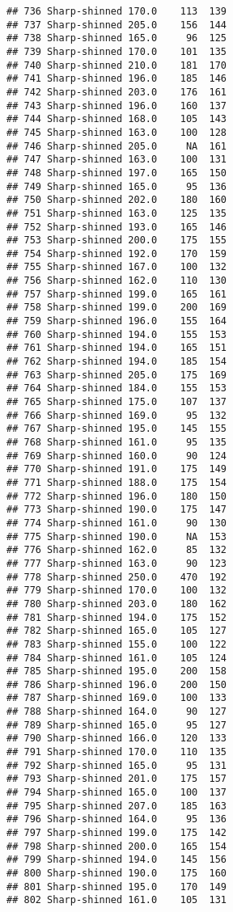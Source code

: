 \documentclass[
]{article}
\begin{document}
\begin{verbatim}
## 736 Sharp-shinned 170.0    113  139
## 737 Sharp-shinned 205.0    156  144
## 738 Sharp-shinned 165.0     96  125
## 739 Sharp-shinned 170.0    101  135
## 740 Sharp-shinned 210.0    181  170
## 741 Sharp-shinned 196.0    185  146
## 742 Sharp-shinned 203.0    176  161
## 743 Sharp-shinned 196.0    160  137
## 744 Sharp-shinned 168.0    105  143
## 745 Sharp-shinned 163.0    100  128
## 746 Sharp-shinned 205.0     NA  161
## 747 Sharp-shinned 163.0    100  131
## 748 Sharp-shinned 197.0    165  150
## 749 Sharp-shinned 165.0     95  136
## 750 Sharp-shinned 202.0    180  160
## 751 Sharp-shinned 163.0    125  135
## 752 Sharp-shinned 193.0    165  146
## 753 Sharp-shinned 200.0    175  155
## 754 Sharp-shinned 192.0    170  159
## 755 Sharp-shinned 167.0    100  132
## 756 Sharp-shinned 162.0    110  130
## 757 Sharp-shinned 199.0    165  161
## 758 Sharp-shinned 199.0    200  169
## 759 Sharp-shinned 196.0    155  164
## 760 Sharp-shinned 194.0    155  153
## 761 Sharp-shinned 194.0    165  151
## 762 Sharp-shinned 194.0    185  154
## 763 Sharp-shinned 205.0    175  169
## 764 Sharp-shinned 184.0    155  153
## 765 Sharp-shinned 175.0    107  137
## 766 Sharp-shinned 169.0     95  132
## 767 Sharp-shinned 195.0    145  155
## 768 Sharp-shinned 161.0     95  135
## 769 Sharp-shinned 160.0     90  124
## 770 Sharp-shinned 191.0    175  149
## 771 Sharp-shinned 188.0    175  154
## 772 Sharp-shinned 196.0    180  150
## 773 Sharp-shinned 190.0    175  147
## 774 Sharp-shinned 161.0     90  130
## 775 Sharp-shinned 190.0     NA  153
## 776 Sharp-shinned 162.0     85  132
## 777 Sharp-shinned 163.0     90  123
## 778 Sharp-shinned 250.0    470  192
## 779 Sharp-shinned 170.0    100  132
## 780 Sharp-shinned 203.0    180  162
## 781 Sharp-shinned 194.0    175  152
## 782 Sharp-shinned 165.0    105  127
## 783 Sharp-shinned 155.0    100  122
## 784 Sharp-shinned 161.0    105  124
## 785 Sharp-shinned 195.0    200  158
## 786 Sharp-shinned 196.0    200  150
## 787 Sharp-shinned 169.0    100  133
## 788 Sharp-shinned 164.0     90  127
## 789 Sharp-shinned 165.0     95  127
## 790 Sharp-shinned 166.0    120  133
## 791 Sharp-shinned 170.0    110  135
## 792 Sharp-shinned 165.0     95  131
## 793 Sharp-shinned 201.0    175  157
## 794 Sharp-shinned 165.0    100  137
## 795 Sharp-shinned 207.0    185  163
## 796 Sharp-shinned 164.0     95  136
## 797 Sharp-shinned 199.0    175  142
## 798 Sharp-shinned 200.0    165  154
## 799 Sharp-shinned 194.0    145  156
## 800 Sharp-shinned 190.0    175  160
## 801 Sharp-shinned 195.0    170  149
## 802 Sharp-shinned 161.0    105  131

\end{verbatim}
\end{document}
